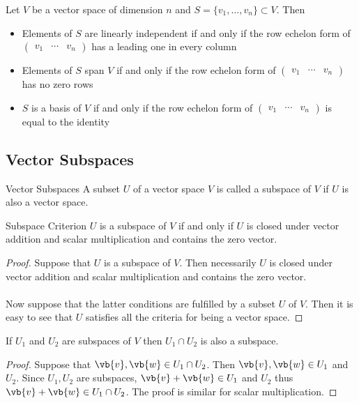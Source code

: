 \begin{thm}{}{} Let $V$ be a vector space of dimension $n$ and $S=\{v_1,\dots,v_n\}\subset V$. Then 
\begin{itemize}
\item Elements of $S$ are linearly independent if and only if the row echelon form of $\begin{pmatrix}v_1 & \cdots & v_n\end{pmatrix}$ has a leading one in every column
\item Elements of $S$ span $V$ if and only if the row echelon form of $\begin{pmatrix}v_1 & \cdots & v_n\end{pmatrix}$ has no zero rows
\item $S$ is a basis of $V$ if and only if the row echelon form of $\begin{pmatrix}v_1 & \cdots & v_n\end{pmatrix}$ is equal to the identity
\end{itemize}
\end{thm}

\subsection{Vector Subspaces}
\begin{defn}{Vector Subspaces}{} A subset $U$ of a vector space $V$ is called a subspace of $V$ if $U$ is also a vector space. 
\end{defn}

\begin{prp}{Subspace Criterion}{} $U$ is a subspace of $V$ if and only if $U$ is closed under vector addition and scalar multiplication and contains the zero vector. \tcbline
\begin{proof}
Suppose that $U$ is a subspace of $V$. Then necessarily $U$ is closed under vector addition and scalar multiplication and contains the zero vector. \\~\\
Now suppose that the latter conditions are fulfilled by a subset $U$ of $V$. Then it is easy to see that $U$ satisfies all the criteria for being a vector space. 
\end{proof}
\end{prp}

\begin{prp}{}{} If $U_1$ and $U_2$ are subspaces of $V$ then $U_1\cap U_2$ is also a subspace. \tcbline
\begin{proof} Suppose that $\vb{v},\vb{w}\in U_1\cap U_2$. Then $\vb{v},\vb{w}\in U_1$ and $U_2$. Since $U_1,U_2$ are subspaces, $\vb{v}+\vb{w}\in U_1$ and $U_2$ thus $\vb{v}+\vb{w}\in U_1\cap U_2$. The proof is similar for scalar multiplication. 
\end{proof}
\end{prp}

